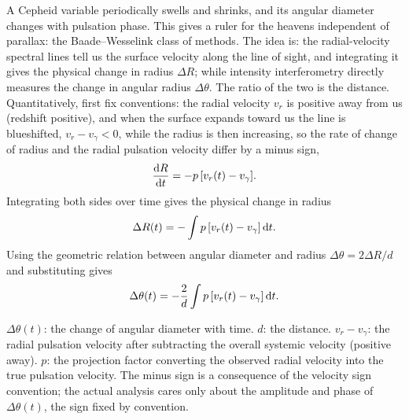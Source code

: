 A Cepheid variable periodically swells and shrinks, and its angular diameter changes with pulsation phase. This gives a ruler for the heavens independent of parallax: the Baade--Wesselink class of methods. The idea is: the radial-velocity spectral lines tell us the surface velocity along the line of sight, and integrating it gives the physical change in radius \(\Delta R\); while intensity interferometry directly measures the change in angular radius \(\Delta\theta\). The ratio of the two is the distance. Quantitatively, first fix conventions: the radial velocity \(v_r\) is positive away from us (redshift positive), and when the surface expands toward us the line is blueshifted, \(v_r-v_\gamma<0\), while the radius is then increasing, so the rate of change of radius and the radial pulsation velocity differ by a minus sign,
\[
  \frac{{\rm d}R}{{\rm d}t}=-p\,[v_r(t)-v_\gamma].
\]
Integrating both sides over time gives the physical change in radius
\[
  \Delta R(t)=-\int p\,[v_r(t)-v_\gamma]\,{\rm d}t.
\]
Using the geometric relation between angular diameter and radius \(\Delta\theta=2\Delta R/d\) and substituting gives
\begin{equation}
  \Delta\theta(t)=-\frac{2}{d}
  \int p\,[v_r(t)-v_\gamma]\,{\rm d}t .
  \label{eq:e17-baade-wesselink}
\end{equation}
\begin{formulaexplain}
\(\Delta\theta(t)\): the change of angular diameter with time. \(d\): the distance. \(v_r-v_\gamma\): the radial pulsation velocity after subtracting the overall systemic velocity (positive away). \(p\): the projection factor converting the observed radial velocity into the true pulsation velocity. The minus sign is a consequence of the velocity sign convention; the actual analysis cares only about the amplitude and phase of \(\Delta\theta(t)\), the sign fixed by convention.
\end{formulaexplain}
